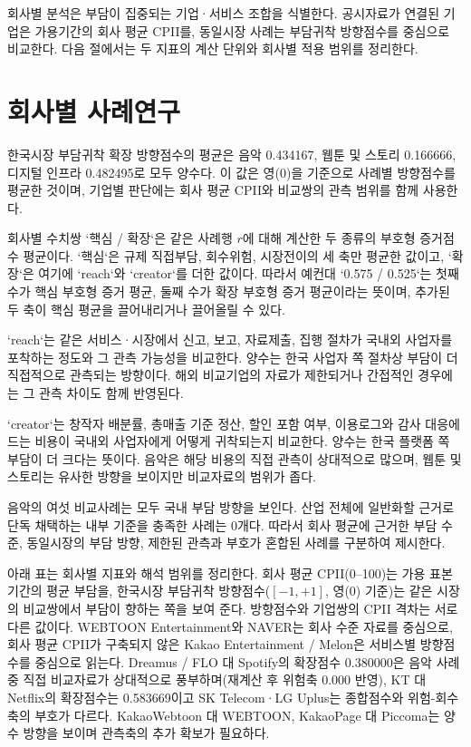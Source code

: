 \documentclass[11pt,a4paper]{report}
\begin{document}
회사별 분석은 부담이 집중되는 기업·서비스 조합을 식별한다. 공시자료가 연결된 기업은 가용기간의 회사 평균 CPII를, 동일시장 사례는 부담귀착 방향점수를 중심으로 비교한다. 다음 절에서는 두 지표의 계산 단위와 회사별 적용 범위를 정리한다.

\section{회사별 사례연구}
한국시장 부담귀착 확장 방향점수의 평균은 음악 0.434167, 웹툰 및 스토리 0.166666, 디지털 인프라 0.482495로 모두 양수다. 이 값은 영(0)을 기준으로 사례별 방향점수를 평균한 것이며, 기업별 판단에는 회사 평균 CPII와 비교쌍의 관측 범위를 함께 사용한다.

회사별 수치쌍 `핵심 / 확장`은 같은 사례행 \(r\)에 대해 계산한 두 종류의 부호형 증거점수 평균이다. `핵심`은 규제 직접부담, 회수위험, 시장전이의 세 축만 평균한 값이고, `확장`은 여기에 `reach`와 `creator`를 더한 값이다. 따라서 예컨대 `0.575 / 0.525`는 첫째 수가 핵심 부호형 증거 평균, 둘째 수가 확장 부호형 증거 평균이라는 뜻이며, 추가된 두 축이 핵심 평균을 끌어내리거나 끌어올릴 수 있다.

`reach`는 같은 서비스·시장에서 신고, 보고, 자료제출, 집행 절차가 국내외 사업자를 포착하는 정도와 그 관측 가능성을 비교한다. 양수는 한국 사업자 쪽 절차상 부담이 더 직접적으로 관측되는 방향이다. 해외 비교기업의 자료가 제한되거나 간접적인 경우에는 그 관측 차이도 함께 반영된다.

`creator`는 창작자 배분률, 총매출 기준 정산, 할인 포함 여부, 이용로그와 감사 대응에 드는 비용이 국내외 사업자에게 어떻게 귀착되는지 비교한다. 양수는 한국 플랫폼 쪽 부담이 더 크다는 뜻이다. 음악은 해당 비용의 직접 관측이 상대적으로 많으며, 웹툰 및 스토리는 유사한 방향을 보이지만 비교자료의 범위가 좁다.

음악의 여섯 비교사례는 모두 국내 부담 방향을 보인다. 산업 전체에 일반화할 근거로 단독 채택하는 내부 기준을 충족한 사례는 0개다. 따라서 회사 평균에 근거한 부담 수준, 동일시장의 부담 방향, 제한된 관측과 부호가 혼합된 사례를 구분하여 제시한다.

아래 표는 회사별 지표와 해석 범위를 정리한다. 회사 평균 CPII(0--100)는 가용 표본기간의 평균 부담을, 한국시장 부담귀착 방향점수($[-1,+1]$, 영(0) 기준)는 같은 시장의 비교쌍에서 부담이 향하는 쪽을 보여 준다. 방향점수와 기업쌍의 CPII 격차는 서로 다른 값이다. WEBTOON Entertainment와 NAVER는 회사 수준 자료를 중심으로, 회사 평균 CPII가 구축되지 않은 Kakao Entertainment / Melon은 서비스별 방향점수를 중심으로 읽는다. Dreamus / FLO 대 Spotify의 확장점수 0.380000은 음악 사례 중 직접 비교자료가 상대적으로 풍부하며(재계산 후 위험축 0.000 반영), KT 대 Netflix의 확장점수는 0.583669이고 SK Telecom·LG Uplus는 종합점수와 위험-회수 축의 부호가 다르다. KakaoWebtoon 대 WEBTOON, KakaoPage 대 Piccoma는 양수 방향을 보이며 관측축의 추가 확보가 필요하다.
\end{document}
